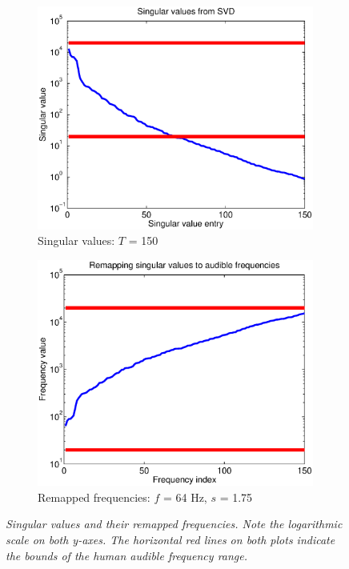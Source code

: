 \begin{figure}
	\begin{subfigure}[h]{0.5\textwidth}
		\includegraphics[width=\textwidth]{chap5/figures/singulars.eps}
		\caption{Singular values: $T$ = 150} 
		\label{fig:singulars}
	\end{subfigure}
	\begin{subfigure}[h]{0.5\textwidth}
		\includegraphics[width=\textwidth]{chap5/figures/remap_freqs.eps}
		\caption{Remapped frequencies: $f$ = 64 Hz, $s$ = 1.75}
		\label{fig:freqs}
	\end{subfigure}
	\caption{\em Singular values and their remapped frequencies. Note the logarithmic scale on both y-axes. The horizontal red lines on both plots indicate the bounds of the human audible frequency range.}
\end{figure}

